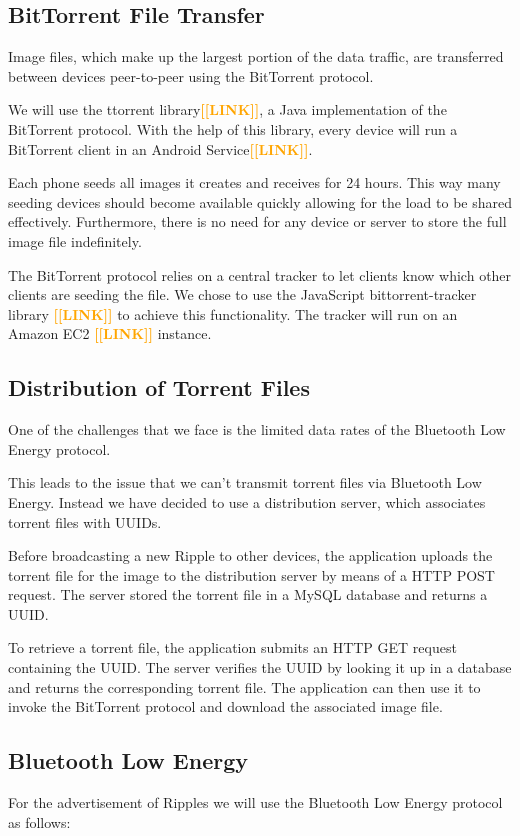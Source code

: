 \documentclass{report}
\newcommand{\todo}[1]{\textsf{\textbf{\textcolor{orange}{[[#1]]}}}}
\begin{document}
\subsection{BitTorrent File Transfer}
Image files, which make up the largest portion of the data traffic, are transferred between devices peer-to-peer using the BitTorrent protocol.

We will use the ttorrent library\todo{LINK}, a Java implementation of the BitTorrent protocol. With the help of this library, every device will run a BitTorrent client in an Android Service\todo{LINK}.

Each phone seeds all images it creates and receives for 24 hours. This way many seeding devices should become available quickly allowing for the load to be shared effectively. Furthermore, there is no need for any device or server to store the full image file indefinitely.

The BitTorrent protocol relies on a central tracker to let clients know which other clients are seeding the file. We chose to use the JavaScript bittorrent-tracker library \todo{LINK} to achieve this functionality. The tracker will run on an Amazon EC2 \todo{LINK} instance.

\subsection{Distribution of Torrent Files}
One of the challenges that we face is the limited data rates of the Bluetooth Low Energy protocol.

This leads to the issue that we can't transmit torrent files via Bluetooth Low Energy. Instead we have decided to use a distribution server, which associates torrent files with UUIDs.

Before broadcasting a new Ripple to other devices, the application uploads the torrent file for the image to the distribution server by means of a HTTP POST request. The server stored the torrent file in a MySQL database and returns a UUID. 

To retrieve a torrent file, the application submits an HTTP GET request containing the UUID. The server verifies the UUID by looking it up in a database and returns the corresponding torrent file. The application can then use it to invoke the BitTorrent protocol and download the associated image file.

\subsection{Bluetooth Low Energy}
For the advertisement of Ripples we will use the Bluetooth Low Energy protocol as follows:
\end{document}

